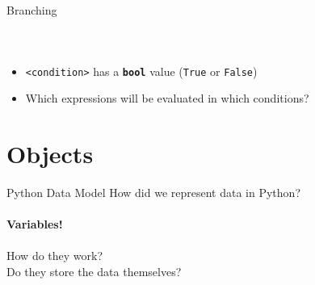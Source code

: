         \begin{frame}{Branching}
            \vspace{-3mm}
            \begin{columns}
                \inputminted[firstline=1, lastline=4, frame=single,framesep=2pt]{python3}{code-examples/branching.py}
                \inputminted[firstline=6, lastline=13, frame=single,framesep=2pt]{python3}{code-examples/branching.py}
                \inputminted[firstline=15, lastline=27, frame=single,framesep=2pt]{python3}{code-examples/branching.py}
            \end{columns}
            \begin{itemize}
                \item \texttt{<condition>} has a \textbf{\texttt{bool}} value (\texttt{True} or \texttt{False})
                \item Which expressions will be evaluated in which conditions?
            \end{itemize}
        \end{frame}
    
    \section{Objects}
        \begin{frame}[c]{Python Data Model}
            \pause
            \LARGE
            How did we represent data in Python?\\
            \\
            \pause
            \textbf{Variables!}\\
            \pause
            \\
            How do they work?\\
            \pause
             Do they store the data themselves?
            \pause
        \end{frame}

